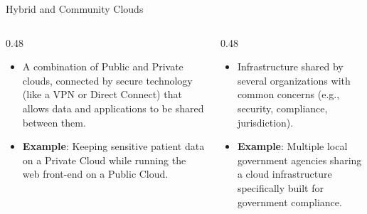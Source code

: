 \documentclass[aspectratio=169]{beamer}  %
\begin{document}
\begin{frame}[t]{Hybrid and Community Clouds}
    \begin{columns}[T]
        \begin{column}{0.48\textwidth}
            \begin{block}{}
                \footnotesize
                \begin{itemize}
                    \item A combination of Public and Private clouds, connected by secure technology (like a VPN or Direct Connect) that allows data and applications to be shared between them.
                    \item \textbf{Example}: Keeping sensitive patient data on a Private Cloud while running the web front-end on a Public Cloud.
                \end{itemize}
            \end{block}
        \end{column}
        \begin{column}{0.48\textwidth}
            \begin{block}{}
                \footnotesize
                \begin{itemize}
                    \item Infrastructure shared by several organizations with common concerns (e.g., security, compliance, jurisdiction).
                    \item \textbf{Example}: Multiple local government agencies sharing a cloud infrastructure specifically built for government compliance.
                \end{itemize}
            \end{block}
        \end{column}
    \end{columns}
\end{frame}
\end{document}
